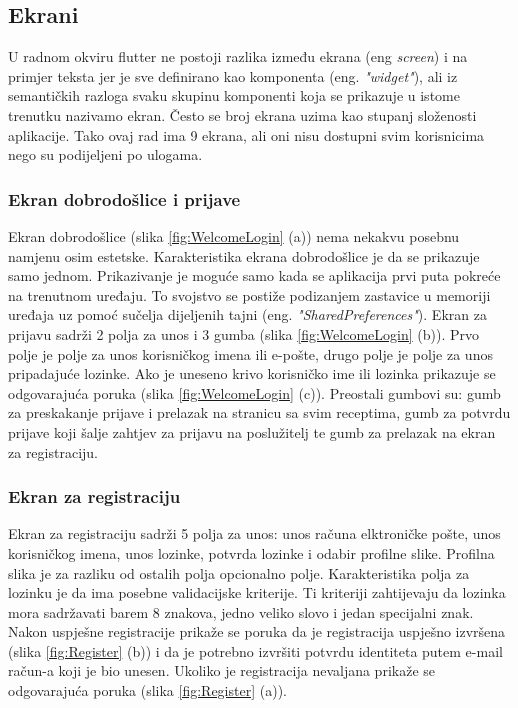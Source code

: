 \documentclass[times, utf8, zavrsni]{fer}
\begin{document}
\subsection{Ekrani}
U radnom okviru flutter ne postoji razlika između ekrana (eng \textit{screen}) i na primjer teksta jer je sve definirano
kao komponenta (eng. \textit{"widget"}), ali iz semantičkih razloga svaku skupinu komponenti koja
se prikazuje u istome trenutku nazivamo ekran. Često se broj ekrana uzima kao stupanj
složenosti aplikacije. Tako ovaj rad ima 9 ekrana, ali oni nisu dostupni svim korisnicima nego
su podijeljeni po ulogama.

\subsubsection{Ekran dobrodošlice i prijave}
Ekran dobrodošlice (slika \ref{fig:WelcomeLogin} (a)) nema nekakvu posebnu namjenu osim estetske.
Karakteristika ekrana dobrodošlice je
da se prikazuje samo jednom. Prikazivanje je moguće samo kada se aplikacija prvi puta pokreće na trenutnom
uređaju. To svojstvo se postiže podizanjem zastavice u memoriji uređaja uz pomoć
sučelja dijeljenih tajni (eng. \textit{"SharedPreferences"}).
Ekran za prijavu sadrži 2 polja za unos i 3 gumba (slika \ref{fig:WelcomeLogin} (b)). Prvo polje je polje za unos
korisničkog imena ili e-pošte, drugo polje je polje za unos pripadajuće lozinke. Ako je uneseno
krivo korisničko ime ili lozinka prikazuje se odgovarajuća poruka (slika \ref{fig:WelcomeLogin} (c)). Preostali gumbovi su:
gumb za preskakanje prijave i prelazak na stranicu sa svim receptima, gumb
za potvrdu prijave koji šalje zahtjev za prijavu na poslužitelj te gumb za prelazak na ekran za registraciju.

\subsubsection{Ekran za registraciju}
Ekran za registraciju sadrži 5 polja za unos: unos računa elktroničke pošte, unos
korisničkog imena, unos lozinke, potvrda lozinke i odabir profilne slike. Profilna slika je za
razliku od ostalih polja opcionalno polje. Karakteristika polja za lozinku je da ima posebne
validacijske kriterije. Ti kriteriji zahtijevaju da lozinka mora
sadržavati barem 8 znakova, jedno veliko slovo i jedan specijalni znak.
Nakon uspješne registracije
prikaže se poruka da je registracija uspješno izvršena (slika \ref{fig:Register} (b)) i da je potrebno izvršiti potvrdu identiteta
putem e-mail račun-a koji je bio unesen. Ukoliko je registracija nevaljana prikaže se odgovarajuća poruka (slika \ref{fig:Register} (a)).
\end{document}
